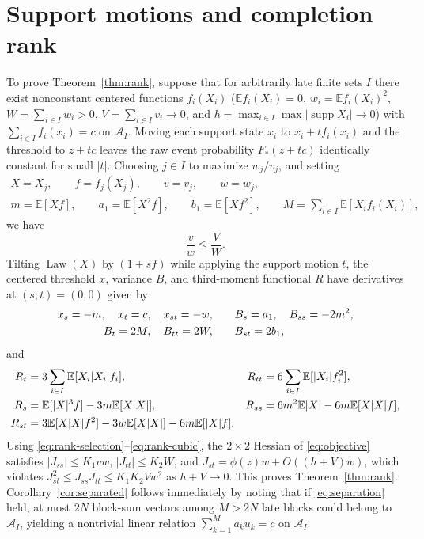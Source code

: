 \documentclass[11pt]{article}
\numberwithin{equation}{section}
\theoremstyle{definition}
\DeclareMathOperator{\supp}{supp}
\DeclareMathOperator{\Law}{Law}
\newcommand{\E}{\mathbb E}
\begin{document}
\section{Support motions and completion rank}\label{sec:rank}

To prove Theorem~\ref{thm:rank}, suppose that for arbitrarily late finite
sets $I$ there exist nonconstant centered functions $f_i(X_i)$ ($\E f_i(X_i)=0$,
$w_i=\E f_i(X_i)^2$, $W=\sum_{i\in I}w_i>0$, $V=\sum_{i\in I}v_i\to0$, and
$h=\max_{i\in I}\max|\supp X_i|\to0$) with $\sum_{i\in I}f_i(x_i)=c$ on
$\mathcal A_I$. Moving each support state $x_i$ to $x_i+tf_i(x_i)$ and the
threshold to $z+tc$ leaves the raw event probability $F_*(z+tc)$ identically
constant for small $|t|$. Choosing $j\in I$ to maximize $w_j/v_j$, and setting
\[
 \begin{gathered}
 X=X_j,\qquad f=f_j(X_j),\qquad v=v_j,\qquad w=w_j,\\
 m=\E[Xf],\qquad a_1=\E[X^2f],\qquad b_1=\E[Xf^2],\qquad
 M=\sum_{i\in I}\E[X_if_i(X_i)],
 \end{gathered}
\]
we have
\begin{equation}\label{eq:rank-selection}
                         \frac{v}{w}\le \frac VW.
\end{equation}
Tilting $\Law(X)$ by $(1+sf)$ while applying the support motion $t$, the
centered threshold $x$, variance $B$, and third-moment functional $R$ have
derivatives at $(s,t)=(0,0)$ given by
\begin{align}
 x_s=-m,\quad x_t=c,\quad x_{st}=-w,&\qquad
 B_s=a_1,\quad B_{ss}=-2m^2,\notag\\
 B_t=2M,\quad B_{tt}=2W,&\qquad B_{st}=2b_1,           \label{eq:rank-moments}
\end{align}
and
\begin{align}
 R_t&=3\sum_{i\in I}\E[X_i|X_i|f_i],&
 R_{tt}&=6\sum_{i\in I}\E[|X_i|f_i^2],\notag\\
 R_s&=\E[|X|^3f]-3m\E[X|X|],&
 R_{ss}&=6m^2\E|X|-6m\E[X|X|f],\notag\\
 R_{st}&=3\E[X|X|f^2]-3w\E[X|X|]
                         -6m\E[|X|f].              \label{eq:rank-cubic}
\end{align}
Using \eqref{eq:rank-selection}--\eqref{eq:rank-cubic}, the $2\times2$
Hessian of \eqref{eq:objective} satisfies $|J_{ss}|\le K_1vw$,
$|J_{tt}|\le K_2W$, and $J_{st}=\phi(z)w+O((h+V)w)$, which violates
$J_{st}^2\le J_{ss}J_{tt}\le K_1K_2Vw^2$ as $h+V\to0$. This proves
Theorem~\ref{thm:rank}. Corollary~\ref{cor:separated} follows immediately by
noting that if \eqref{eq:separation} held, at most $2N$ block-sum vectors
among $M>2N$ late blocks could belong to $\mathcal A_I$, yielding a nontrivial
linear relation $\sum_{k=1}^Ma_ku_k=c$ on $\mathcal A_I$.
\end{document}
